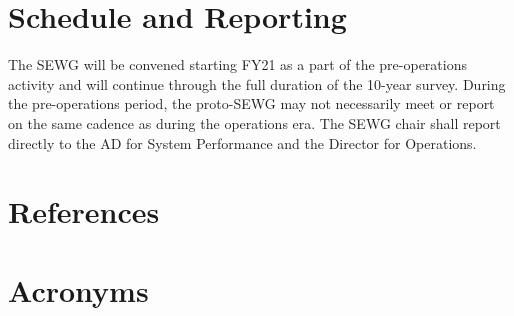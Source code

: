 \documentclass[OPS,authoryear,toc]{lsstdoc}
\begin{document}
\section{Schedule and Reporting}
The SEWG will be convened starting FY21 as a part of the pre-operations activity and will continue through the full duration of the 10-year survey.  
During the pre-operations period, the proto-SEWG may not necessarily meet or report on the same cadence as  during the operations era. 
The SEWG chair shall report directly to the AD for System Performance and the Director for Operations.  


\appendix
\section{References} \label{sec:bib}
\renewcommand{\refname}{} %


\section{Acronyms} \label{sec:acronyms}

\end{document}
